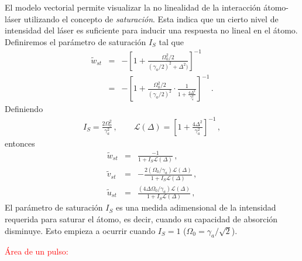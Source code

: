 \documentclass[twocolumn,aps,eqsecnum]{revtex4}
\newcommand{\mcL}{\mathcal{L}}
\begin{document}
El modelo vectorial permite visualizar la no linealidad de la interacci\'on  
\'atomo-l\'aser utilizando el concepto de \textit{saturaci\'on}. Esta indica 
que un cierto nivel de intensidad del l\'aser es suficiente para inducir 
una respuesta no lineal en el \'atomo. Definiremos el par\'ametro de 
saturaci\'on $I_S$ tal que 
%
\begin{eqnarray*}
\tilde{w}_{st} &=& - \left[ 1 + 
	\frac{\Omega_0^2 /2}{(\gamma_a/2)^2 +\Delta^2)} \right]^{-1} \\ 
&=& - \left[ 1 + 
	\frac{\Omega_0^2 /2}{(\gamma_a/2)^2} \cdot 
	\frac{1}{1+ \frac{4\Delta^2}{\gamma_a^2}} \right]^{-1} \,.
\end{eqnarray*}
Definiendo  
%
\begin{eqnarray}
I_S = \frac{2\Omega_0^2}{\gamma_a^2} \,, 	\qquad 
\mcL (\Delta) = \left[ 1+ \frac{4\Delta^2}{\gamma_a^2} \right]^{-1} \,, 
\end{eqnarray}
entonces 
%
\begin{subequations}
\begin{eqnarray}
\tilde{w}_{st} &=& \frac{-1}{ 1+ I_S \mcL(\Delta) } \,,  \\ 
\tilde{v}_{st} &=& -\frac{ 2(\Omega_0/\gamma_a) \mcL(\Delta)} 
	{1+ I_S \mcL(\Delta) } \,, \\
\tilde{u}_{st} &=& \frac{ (4\Delta \Omega_0 /\gamma_a) \mcL(\Delta) }
	{1+ I_S \mcL(\Delta) } \,, 
\end{eqnarray}
\end{subequations}
El par\'ametro de saturaci\'on $I_S$ es una medida adimensional de la 
intensidad requerida para saturar el \'atomo, es decir, cuando su capacidad 
de absorci\'on disminuye. Esto empieza a ocurrir cuando $I_S =1$ 
($\Omega_0 = \gamma_a/\sqrt{2}$).

\textcolor{red}{\'Area de un pulso:} 

\end{document}
